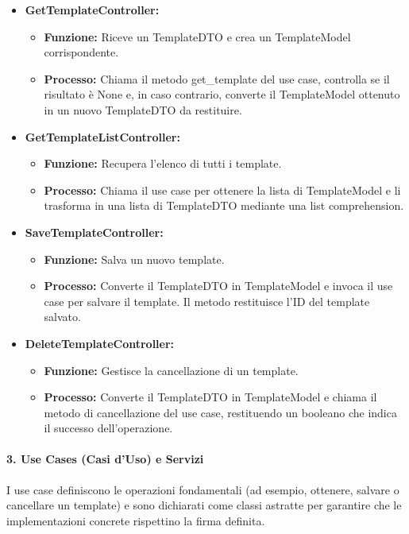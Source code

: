     \begin{itemize}
        \item \textbf{GetTemplateController:}
        \begin{itemize}
            \item \textbf{Funzione:} Riceve un TemplateDTO e crea un TemplateModel corrispondente.
            \item \textbf{Processo:} Chiama il metodo get\_template del use case, controlla se il risultato è None e, in caso contrario, converte il TemplateModel ottenuto in un nuovo TemplateDTO da restituire.
        \end{itemize}
        \item \textbf{GetTemplateListController:}
        \begin{itemize}
            \item \textbf{Funzione:} Recupera l’elenco di tutti i template.
            \item \textbf{Processo:} Chiama il use case per ottenere la lista di TemplateModel e li trasforma in una lista di TemplateDTO mediante una list comprehension.
        \end{itemize}
        \item \textbf{SaveTemplateController:}
        \begin{itemize}
            \item \textbf{Funzione:} Salva un nuovo template.
            \item \textbf{Processo:} Converte il TemplateDTO in TemplateModel e invoca il use case per salvare il template. Il metodo restituisce l’ID del template salvato.
        \end{itemize}
        \item \textbf{DeleteTemplateController:}
        \begin{itemize}
            \item \textbf{Funzione:} Gestisce la cancellazione di un template.
            \item \textbf{Processo:} Converte il TemplateDTO in TemplateModel e chiama il metodo di cancellazione del use case, restituendo un booleano che indica il successo dell’operazione.
        \end{itemize}
    \end{itemize}
    
    \paragraph{3. Use Cases (Casi d’Uso) e Servizi}
    I use case definiscono le operazioni fondamentali (ad esempio, ottenere, salvare o cancellare un template) e sono dichiarati come classi astratte per garantire che le implementazioni concrete rispettino la firma definita.
    
